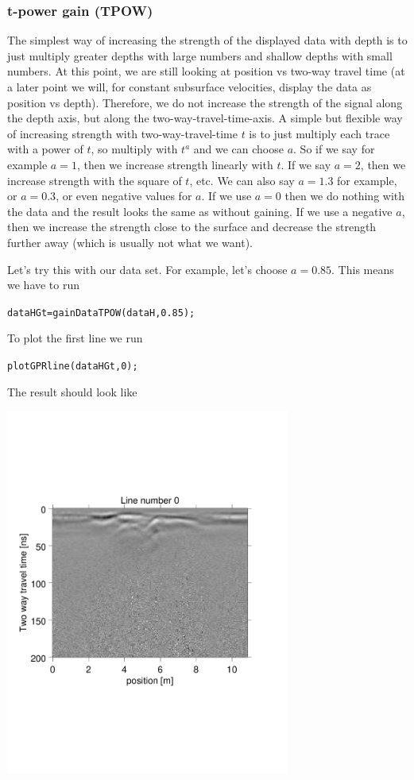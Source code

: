 \documentclass[11pt]{article}
\begin{document}
\subsubsection{t-power gain (TPOW)}

The simplest way of increasing the strength of the displayed data with
depth is to just multiply greater depths with large numbers and
shallow depths with small numbers. At this point, we are still looking
at position vs two-way travel time (at a later point we will, for
constant subsurface velocities, display the data as position vs
depth). Therefore, we do not increase the strength of the signal along
the depth axis, but along the two-way-travel-time-axis. A simple but
flexible way of increasing strength with two-way-travel-time $t$ is to
just multiply each trace with a power of $t$, so multiply with $t^a$
and we can choose $a$. So if we say for example $a=1$, then we
increase strength linearly with $t$. If we say $a=2$, then we increase
strength with the square of $t$, etc. We can also say $a=1.3$ for
example, or $a=0.3$, or even negative values for $a$. If we use $a=0$
then we do nothing with the data and the result looks the same as
without gaining. If we use a negative $a$, then we increase the strength
close to the surface and decrease the strength further away (which is
usually not what we want).

Let's try this with our data set. For example, let's choose
$a=0.85$. This means we have to run

\qquad \verb#dataHGt=gainDataTPOW(dataH,0.85);#

To plot the first line we run

\qquad \verb#plotGPRline(dataHGt,0);#

The result should look like

\begin{center}
\includegraphics[width=0.7\textwidth, trim = 0.9cm 6cm 2cm
  6.5cm,clip]{figures/GPRlineHGt0}
\end{center}
\end{document}
